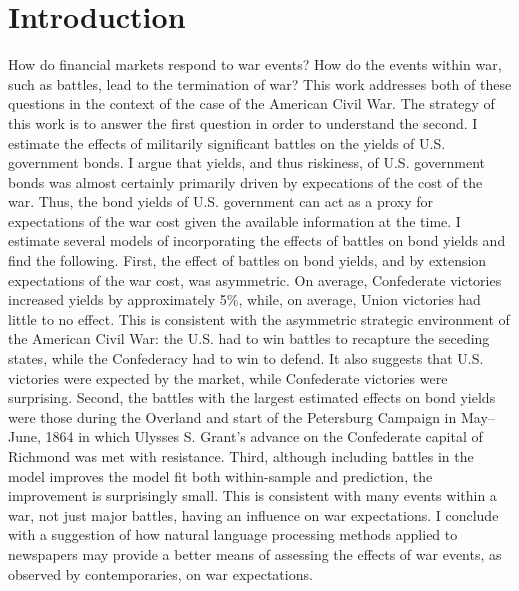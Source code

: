 





\section{Introduction}
\label{sec:introduction}


How do financial markets respond to war events?
How do the events within war, such as battles, lead to the termination of war?
This work addresses both of these questions in the context of the case of the American Civil War. 
The strategy of this work is to answer the first question in order to understand the second.
I estimate the effects of militarily significant battles on the yields of U.S. government bonds.
I argue that yields, and thus riskiness, of U.S. government bonds was almost certainly primarily driven by expecations of the cost of the war.
Thus, the bond yields of U.S. government can act as a proxy for expectations of the war cost given the available information at the time.
I estimate several models of incorporating the effects of battles on bond yields and find the following.
First, the effect of battles on bond yields, and by extension expectations of the war cost, was asymmetric.
On average, Confederate victories increased yields by approximately 5\%, while, on average, Union victories had little to no effect.
This is consistent with the asymmetric strategic environment of the American Civil War: the U.S. had to win battles to recapture the seceding states, while the Confederacy had to win to defend.
It also suggests that U.S. victories were expected by the market, while Confederate victories were surprising.
Second, the battles with the largest estimated effects on bond yields were those during the Overland and start of the Petersburg Campaign in May--June, 1864 in which Ulysses S. Grant's advance on the Confederate capital of Richmond was met with resistance.
Third, although including battles in the model improves the model fit both within-sample and prediction, the improvement is surprisingly small.
This is consistent with many events within a war, not just major battles, having an influence on war expectations.
I conclude with a suggestion of how natural language processing methods applied to newspapers may provide a better means of assessing the effects of war events, as observed by contemporaries, on war expectations.

